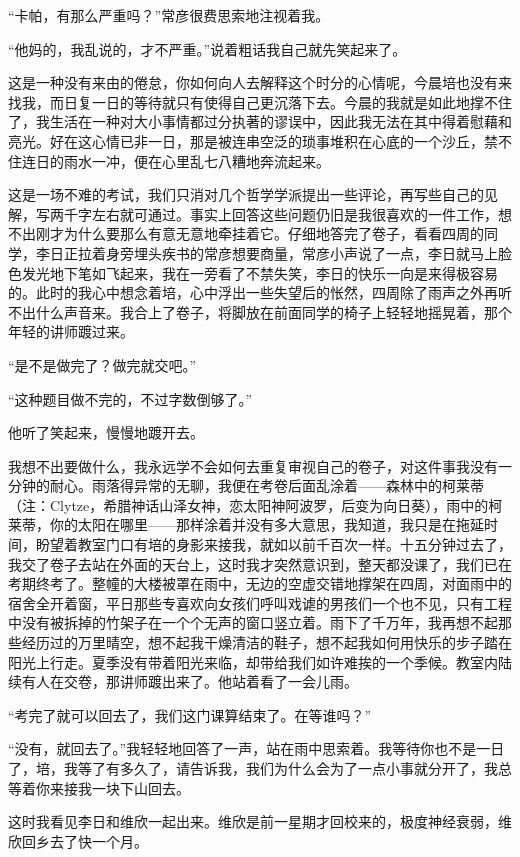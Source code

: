 \par “卡帕，有那么严重吗？”常彦很费思索地注视着我。
\par “他妈的，我乱说的，才不严重。”说着粗话我自己就先笑起来了。
\par 这是一种没有来由的倦怠，你如何向人去解释这个时分的心情呢，今晨培也没有来找我，而日复一日的等待就只有使得自己更沉落下去。今晨的我就是如此地撑不住了，我生活在一种对大小事情都过分执著的谬误中，因此我无法在其中得着慰藉和亮光。好在这心情已非一日，那是被连串空泛的琐事堆积在心底的一个沙丘，禁不住连日的雨水一冲，便在心里乱七八糟地奔流起来。
\par 这是一场不难的考试，我们只消对几个哲学学派提出一些评论，再写些自己的见解，写两千字左右就可通过。事实上回答这些问题仍旧是我很喜欢的一件工作，想不出刚才为什么要那么有意无意地牵挂着它。仔细地答完了卷子，看看四周的同学，李日正拉着身旁埋头疾书的常彦想要商量，常彦小声说了一点，李日就马上脸色发光地下笔如飞起来，我在一旁看了不禁失笑，李日的快乐一向是来得极容易的。此时的我心中想念着培，心中浮出一些失望后的怅然，四周除了雨声之外再听不出什么声音来。我合上了卷子，将脚放在前面同学的椅子上轻轻地摇晃着，那个年轻的讲师踱过来。
\par “是不是做完了？做完就交吧。”
\par “这种题目做不完的，不过字数倒够了。”
\par 他听了笑起来，慢慢地踱开去。
\par 我想不出要做什么，我永远学不会如何去重复审视自己的卷子，对这件事我没有一分钟的耐心。雨落得异常的无聊，我便在考卷后面乱涂着——森林中的柯莱蒂（注：Clytze，希腊神话山泽女神，恋太阳神阿波罗，后变为向日葵），雨中的柯莱蒂，你的太阳在哪里——那样涂着并没有多大意思，我知道，我只是在拖延时间，盼望着教室门口有培的身影来接我，就如以前千百次一样。十五分钟过去了，我交了卷子去站在外面的天台上，这时我才突然意识到，整天都没课了，我们已在考期终考了。整幢的大楼被罩在雨中，无边的空虚交错地撑架在四周，对面雨中的宿舍全开着窗，平日那些专喜欢向女孩们呼叫戏谑的男孩们一个也不见，只有工程中没有被拆掉的竹架子在一个个无声的窗口竖立着。雨下了千万年，我再想不起那些经历过的万里晴空，想不起我干燥清洁的鞋子，想不起我如何用快乐的步子踏在阳光上行走。夏季没有带着阳光来临，却带给我们如许难挨的一个季候。教室内陆续有人在交卷，那讲师踱出来了。他站着看了一会儿雨。
\par “考完了就可以回去了，我们这门课算结束了。在等谁吗？”
\par “没有，就回去了。”我轻轻地回答了一声，站在雨中思索着。我等待你也不是一日了，培，我等了有多久了，请告诉我，我们为什么会为了一点小事就分开了，我总等着你来接我一块下山回去。
\par 这时我看见李日和维欣一起出来。维欣是前一星期才回校来的，极度神经衰弱，维欣回乡去了快一个月。
